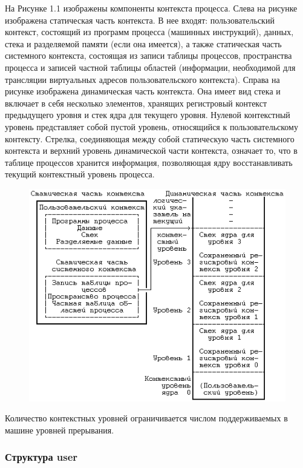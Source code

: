 \documentclass[14pt,a4paper,report]{report}
\begin{document}
На Рисунке 1.1 изображены компоненты контекста процесса. Слева на рисунке изображена статическая часть контекста. В нее входят: пользовательский контекст, состоящий из программ процесса (машинных инструкций), данных, стека и разделяемой памяти (если она имеется), а также статическая часть системного контекста, состоящая из записи таблицы процессов, пространства процесса и записей частной таблицы областей (информации, необходимой для трансляции виртуальных адресов пользовательского контекста). Справа на рисунке изображена динамическая часть контекста. Она имеет вид стека и включает в себя несколько элементов, хранящих регистровый контекст предыдущего уровня и стек ядра для текущего уровня. Нулевой контекстный уровень представляет собой пустой уровень, относящийся к пользовательскому контексту. Стрелка, соединяющая между собой статическую часть системного контекста и верхний уровень динамической части контекста, означает то, что в таблице процессов хранится информация, позволяющая ядру восстанавливать текущий контекстный уровень процесса.

\begin{figure}[h!]
	\centering
	\includegraphics[scale = 1.0]{images/1.png}
	
	\caption{}
	\label{image:1}
\end{figure}

Количество контекстных уровней ограничивается числом поддерживаемых в машине уровней прерывания.

\subsubsection{Структура user}
\end{document}
